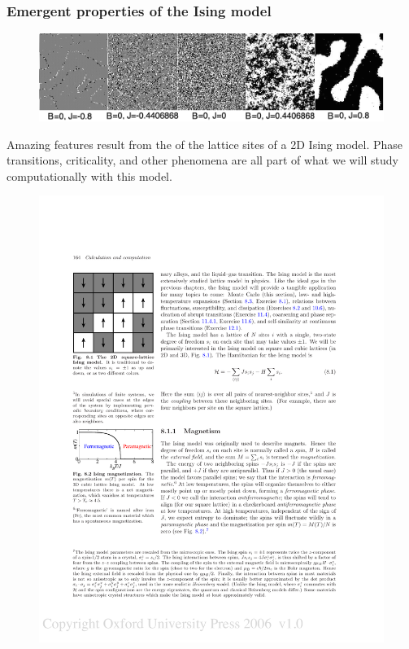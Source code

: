 \documentclass[hyperref={colorlinks=true}]{beamer}
\begin{document}
\begin{frame}%
  \frametitle{Emergent properties of the Ising model}
  
    \begin{figure}
      \centering
      \includegraphics[width=\columnwidth]{IsingDomains.png}
    \end{figure}
  
  Amazing features result from the  of the lattice sites of a 2D Ising model. Phase transitions, criticality, and other phenomena are all part of what we will study computationally with this model. 

  \begin{figure}
      \centering
      \includegraphics[width=0.5\columnwidth]{MagnetizationPerSpin.pdf}
  \end{figure}
  
\end{frame}


\end{document}
